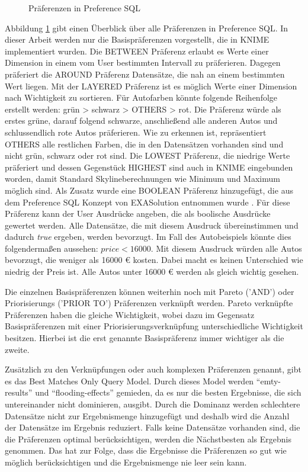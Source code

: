 {\begin{figure}[H]
\begin{tikzpicture}
\end{tikzpicture}
	\caption{Präferenzen in Preference SQL}
	\label{img:preferences}
\end{figure} 

Abbildung \ref{img:preferences} gibt einen Überblick über alle Präferenzen in Preference SQL. In dieser Arbeit werden nur die Basispräferenzen vorgestellt, die in KNIME implementiert wurden. Die BETWEEN Präferenz erlaubt es Werte einer Dimension in einem vom User bestimmten Intervall zu präferieren. Dagegen präferiert die AROUND Präferenz Datensätze, die nah an einem bestimmten Wert liegen. Mit der LAYERED Präferenz ist es möglich Werte einer Dimension nach Wichtigkeit zu sortieren. Für Autofarben könnte folgende Reihenfolge erstellt werden: grün > schwarz > OTHERS > rot. Die Präferenz würde als erstes grüne, darauf folgend schwarze, anschließend alle anderen Autos und schlussendlich rote Autos präferieren. Wie zu erkennen ist, repräsentiert OTHERS alle restlichen Farben, die in den Datensätzen vorhanden sind und nicht grün, schwarz oder rot sind.
Die LOWEST Präferenz, die niedrige Werte präferiert und dessen Gegenstück HIGHEST sind auch in KNIME eingebunden worden, damit Standard Skylineberechnungen wie Minimum und Maximum möglich sind.
Als Zusatz wurde eine BOOLEAN Präferenz hinzugefügt, die aus dem Preference SQL Konzept von EXASolution entnommen wurde \cite{EXASolution}. Für diese Präferenz kann der User Ausdrücke angeben, die als boolische Ausdrücke gewertet werden. Alle Datensätze, die mit diesem Ausdruck übereinstimmen und dadurch \textit{true} ergeben, werden bevorzugt. Im Fall des Autobeispiels könnte dies folgendermaßen aussehen: $price < 16000$. Mit diesem Ausdruck würden alle Autos bevorzugt, die weniger als 16000 \euro{} kosten. Dabei macht es keinen Unterschied wie niedrig der Preis ist. Alle Autos unter 16000 \euro{} werden als gleich wichtig gesehen. 

Die einzelnen Basispräferenzen können weiterhin noch mit Pareto ('AND') oder Priorisierungs ('PRIOR TO') Präferenzen verknüpft werden. Pareto verknüpfte Präferenzen haben die gleiche Wichtigkeit, wobei dazu im Gegensatz Basispräferenzen mit einer Priorisierungsverknüpfung unterschiedliche Wichtigkeit besitzen. Hierbei ist die erst genannte Basispräferenz immer wichtiger als die zweite.  

Zusätzlich zu den Verknüpfungen oder auch komplexen Präferenzen genannt, gibt es das Best Matches Only Query Model. Durch dieses Model werden \enquote{emty-results} und \enquote{flooding-effects} gemieden, da es nur die besten Ergebnisse, die sich untereinander nicht dominieren, ausgibt. Durch die Dominanz werden schlechtere Datensätze nicht zur Ergebnismenge hinzugefügt und deshalb wird die Anzahl der Datensätze im Ergebnis reduziert. Falls keine Datensätze vorhanden sind, die die Präferenzen optimal berücksichtigen, werden die Nächstbesten als Ergebnis genommen. Das hat zur Folge, dass die Ergebnisse die Präferenzen so gut wie möglich berücksichtigen und die Ergebnismenge nie leer sein kann.

}
